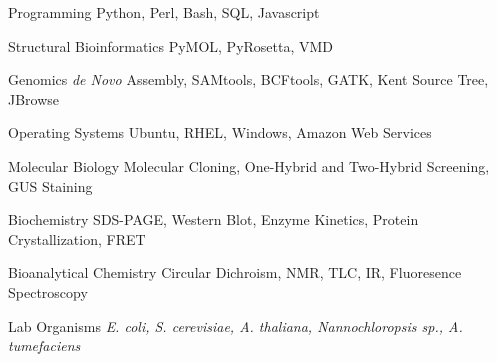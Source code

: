 

\begin{cvskills}

  \cvskill
    {Programming} %
    {Python, Perl, Bash, SQL, Javascript} %

  \cvskill
    {Structural Bioinformatics} %
    {PyMOL, PyRosetta, VMD} %

  \cvskill
    {Genomics} %
    {\textit{de Novo} Assembly, SAMtools, BCFtools, GATK, Kent Source Tree, JBrowse} %

  \cvskill
    {Operating Systems} %
    {Ubuntu, RHEL, Windows, Amazon Web Services} %

  \cvskill
    {Molecular Biology} %
    {Molecular Cloning, One-Hybrid and Two-Hybrid Screening, GUS Staining} %

  \cvskill
    {Biochemistry} %
    {SDS-PAGE, Western Blot, Enzyme Kinetics, Protein Crystallization, FRET} %

  \cvskill
    {Bioanalytical Chemistry} %
    {Circular Dichroism, NMR, TLC, IR, Fluoresence Spectroscopy} %

  \cvskill
    {Lab Organisms} %
    {\textit{E. coli, S. cerevisiae, A. thaliana, Nannochloropsis sp., A. tumefaciens}} %
    
\vspace{-6.0mm}
\end{cvskills}